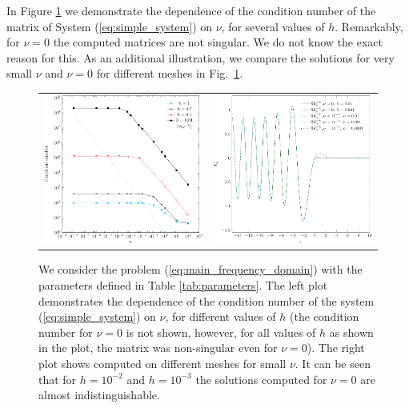 In Figure \ref{fig:small_nu} we demonstrate the dependence of the condition number of the matrix of System (\ref{eq:simple_system}) 
on $\nu$, for several values of $h$.
Remarkably, for $\nu=0$ the computed matrices are not singular. We do not know the exact reason for this.
As an additional illustration, we compare the solutions for very small $\nu$ and $\nu=0$ for different meshes in Fig.~\ref{fig:small_nu}. 
\begin{figure}[htb!]
\begin{tabular}{cc}
\includegraphics[height=0.32\textwidth]{pics_frequency_domain/fig_cond_num.pdf}&
 \includegraphics[height=0.32\textwidth]{pics_frequency_domain/ey_resonance.pdf}
 \end{tabular}
 \caption{
 We consider the problem (\ref{eq:main_frequency_domain}) with the parameters 
defined in Table \ref{tab:parameters}. The left plot demonstrates the dependence of the condition number of the system (\ref{eq:simple_system}) on $\nu$, for different values of $h$ (the condition 
 number for $\nu=0$ is not shown, however, for all values of $h$ as shown in the plot, the matrix was non-singular even for $\nu=0$). 
 The right plot shows  computed on different meshes for small $\nu$. It can be seen that for $h=10^{-2}$ and $h=10^{-3}$ the solutions 
 computed for $\nu=0$ are almost indistinguishable.}
 \label{fig:small_nu}
\end{figure}
